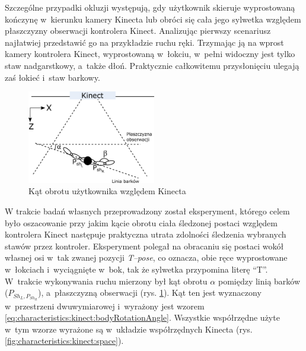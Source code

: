 Szczególne przypadki okluzji występują, gdy użytkownik skieruje wyprostowaną kończynę w~kierunku kamery Kinecta lub obróci się cała jego sylwetka względem płaszczyzny obserwacji kontrolera Kinect. Analizując pierwszy scenariusz najłatwiej przedstawić go na przykładzie ruchu ręki. Trzymając ją na wprost kamery kontrolera Kinect, wyprostowaną w~łokciu, w~pełni widoczny jest tylko staw nadgarstkowy, a~także dłoń. Praktycznie całkowitemu przysłonięciu ulegają zaś łokieć i~staw barkowy. 
																																			
\begin{savenotes}
	\begin{figure}[!htb]
		\centering
		\includegraphics[width=0.5\textwidth]{images/kinectAngle.png}
		\caption{Kąt obrotu użytkownika względem Kinecta}
		\label{fig:characteristics:kinect:bodyRotationAngle}
	\end{figure}
\end{savenotes}
																																					
W trakcie badań własnych przeprowadzony został eksperyment, którego celem było oszacowanie przy jakim kącie obrotu ciała śledzonej postaci względem kontrolera Kinect następuje praktyczna utrata zdolności śledzenia wybranych stawów przez kontroler. Eksperyment polegał na obracaniu się postaci wokół własnej osi w~tak zwanej pozycji \emph{T--pose}, co oznacza, obie ręce wyprostowane w~łokciach i~wyciągnięte w~bok, tak że sylwetka przypomina literę "`T"'. W~trakcie wykonywania ruchu mierzony był kąt obrotu $\alpha$ pomiędzy linią barków ($P_{{Sh}_L, P_{{Sh}_R}}$), a~płaszczyzną obserwacji (rys. \ref{fig:characteristics:kinect:bodyRotationAngle}). Kąt ten jest wyznaczony w~przestrzeni dwuwymiarowej i~wyrażony jest wzorem \ref{eq:characteristics:kinect:bodyRotationAngle}. Wszystkie współrzędne użyte w~tym wzorze wyrażone są w~układzie współrzędnych Kinecta (rys. \ref{fig:characteristics:kinect:space}).
																																			
